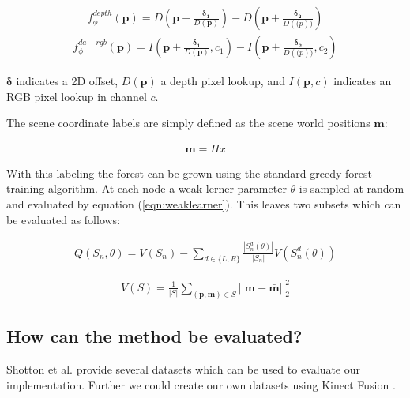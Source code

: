 \begin{eqnarray}
  f_{\phi}^{depth}(\mathbf{p}) = D(\mathbf{p} + \frac{\mathbf{\delta_1}}{D(\mathbf{p})}) - D(\mathbf{p} + \frac{\mathbf{\delta_2}}{D(\mathbf(p))})
\end{eqnarray}
\begin{eqnarray}
  f_{\phi}^{da-rgb}(\mathbf{p}) = I(\mathbf{p} + \frac{\mathbf{\delta_1}}{D(\mathbf{p})},c_1) - I(\mathbf{p} + \frac{\mathbf{\delta_2}}{D(\mathbf(p))},c_2)
\end{eqnarray}

$\mathbf{\delta}$ indicates a 2D offset, $D(\mathbf{p})$ a depth pixel lookup, and $I(\mathbf{p},c)$ indicates an RGB pixel lookup in channel $c$.

The scene coordinate labels are simply defined as the scene world positions $\mathbf{m}$:

\begin{eqnarray*}
  \mathbf{m} = Hx
\end{eqnarray*}

With this labeling the forest can be grown using the standard greedy forest training algorithm. At each node a weak lerner parameter $\theta$ is sampled at random and evaluated by equation (\ref{eqn:weaklearner}). This leaves two subsets which can be evaluated as follows:


\begin{eqnarray}
  Q(S_n,\theta) = V(S_n) - \sum_{d\in\{L,R\}}{\frac{|S_n^d(\theta)|}{|S_n|}V(S_n^d(\theta))}
\end{eqnarray}

\begin{eqnarray}
  V(S) = \frac{1}{|S|} \sum_{(\mathbf{p},\mathbf{m}) \in S}{||\mathbf{m} - \mathbf{\bar m}||_2^2}
\end{eqnarray}



\subsection{How can the method be evaluated?} %
\label{sub:how_can_the_method_be_evaluated_}

Shotton et al. \cite{shotton} provide several datasets which can be used to evaluate our implementation. Further we could create our own datasets using Kinect Fusion \cite{izadi_fusion} \cite{newcombe_fusion}.



\clearpage
\renewcommand{\leftmark}{}




%





